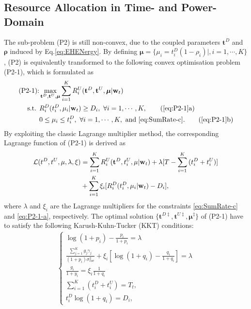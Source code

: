 \documentclass[12pt,draftcls,onecolumn,journal]{IEEEtran}
\begin{document}
\subsection{Resource Allocation in Time- and Power-Domain}

The sub-problem (P2) is still non-convex, due to the coupled parameters $\mathbf{t}^D$ and $\boldsymbol{\rho}$ induced by Eq.\ref{eq:EHENergy}. By defining $\boldsymbol{\mu} = \{\mu_i = t_i^D(1-\rho_i) | ,i=1,\cdots,K\}$, (P2) is equivalently transformed to the following convex optimisation problem (P2-1), which is formulated as
\begin{align}
	\text{(P2-1):} & \max_{\mathbf{t}^D, \mathbf{t}^U, \boldsymbol{\mu}} \sum_{i=1}^K R_{i}^U (\mathbf{t}^D, \mathbf{t}^U, \boldsymbol{\mu} | \mathbf{w}_t) \label{eq:P2-1}\\
	\text{s.t. }    & R_{i}^D (t_i^D, \mu_i | \mathbf{w}_t) \geq D_i,\ \forall i = 1,\cdots, K, \tag{\ref{eq:P2-1}a} \label{eq:P2-1-a}\\
					& 0\leq \mu_i \leq t_i^D, \ \forall i = 1,\cdots, K, \text{ and \eqref{eq:SumRate-c}}. \tag{\ref{eq:P2-1}b} \label{eq:P2-1-b}
\end{align}
By exploiting the classic Lagrange multiplier method, the corresponding Lagrange function of (P2-1) is derived as
\begin{align}
\mathcal{L}(t^D,t^U,\mu,\lambda,\xi) & = \sum_{i=1}^{K}R_i^U(\mathbf{t}^D,t_i^U,\mathbf{\mu} | \mathbf{w}_t) +\lambda[T-\sum_{i=1}^{K}{(t_i^D+t_i^U)}] \notag \\
& +\sum_{i=1}^{K}\xi_i[R_i^D(t_i^D,\mu_i | \mathbf{w}_t) - D_i],
\end{align}
where $\lambda$ and $\xi_i$ are the Lagrange multipliers for the constraints \eqref{eq:SumRate-c} and \eqref{eq:P2-1-a}, respectively. The optimal solution $\{\mathbf{t}^{D\ddagger}, \mathbf{t}^{U\ddagger}, \boldsymbol{\mu}^{\ddagger}\}$ of (P2-1) have to satisfy the following Karush-Kuhn-Tucker (KKT) conditions:
\begin{align}
	\left\{
	\begin{array}{l}
		\log(1+p_i)-\frac{p_i}{1+p_i}=\lambda \\
 		\frac{\sum_{j = 1}^K g_j\gamma_j}{(1 + p_i)\sigma_{cov}^2}+\xi_i[\log(1+q_i) - \frac{q_i}{1+q_i}]=\lambda \\
		\frac{g_i}{1+y_i} = \xi_i \frac{1}{1+q_i} \\
	    \sum_{i=1}^K(t_i^{D} + t_i^{U}) = T_t, \\
        t_i^{D}\log(1 + q_i) = D_i,
	\end{array}
	\right. \label{eq:Sum-KKT}
\end{align}
\end{document}
